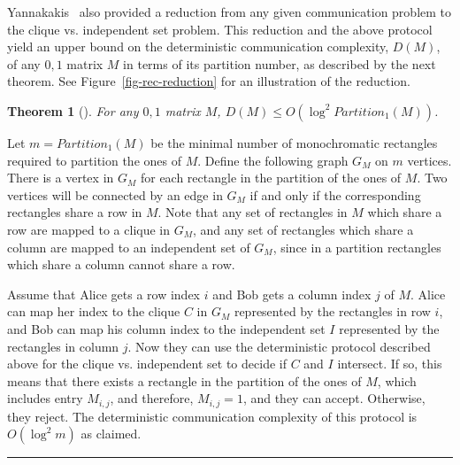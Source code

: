 \documentclass[11pt]{article}
\newtheorem{theorem}{Theorem}
\newcommand{\qedsymb}{\hfill{\rule{2mm}{2mm}}}
\renewenvironment{proof}[1][]{\begin{trivlist}
\item[\hspace{\labelsep}{\bf\noindent Proof#1:\/}] }{\qedsymb\end{trivlist}}
\begin{document}
Yannakakis~\cite{Yannakakis91} also provided a reduction from any given communication problem to the clique vs. independent set problem.
This reduction and the above protocol yield an upper bound on the deterministic communication complexity, $D(M)$, of any $0,1$ matrix $M$ in terms of its partition number,
as described by the next theorem. See Figure~\ref{fig-rec-reduction} for an illustration of the reduction.

\begin{theorem}[\cite{Yannakakis91}]
\label{theo-rec-reduction}
For any  $0,1$ matrix $M$, $D(M) \leq O(\log ^2 Partition_1(M))$.
\end{theorem}
\begin{proof}
Let $m = Partition_1(M)$ be the minimal number of monochromatic rectangles required to partition the ones of $M$. 
Define the following graph $G_M$ on $m$ vertices. There is a vertex in $G_M$ for each rectangle in the partition of the ones of $M$.
Two vertices  will be connected by an edge in $G_M$ if and only if the corresponding rectangles share a row in $M$.
Note that any set of rectangles in $M$ which share a row are mapped to a clique in $G_M$, and any set of rectangles which share a column are mapped to an independent set of $G_M$,
since in a partition rectangles which share a column  cannot share a row.

Assume that Alice gets a row index $i$ and Bob gets a column index $j$ of $M$.
Alice can map her index to the clique $C$ in $G_M$ represented by the rectangles in row $i$,
and Bob can map his column index to the independent set $I$ represented by the rectangles in column $j$.
Now they can use the deterministic protocol described above for the clique vs. independent set to decide if $C$ and $I$ intersect.
If so, this means that there exists a rectangle in the partition of the ones of $M$, which includes entry $M_{i,j}$, and therefore, $M_{i,j} = 1$, and they can accept.
Otherwise, they reject.
The deterministic communication complexity of this protocol is $O(\log^2 m)$ as claimed.
\end{proof}
\end{document}
